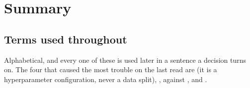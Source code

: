 
\section{Summary}
\label{sec:summary}

\subsection{Terms used throughout}
\label{sec:terms}

Alphabetical, and every one of these is used later in a sentence a decision turns on. The
four that caused the most trouble on the last read are  (it is a
hyperparameter configuration, never a data split), , 
against , and .

